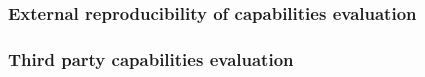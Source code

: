 \documentclass{article}
\begin{document}

\subsubsection{External reproducibility of capabilities evaluation}

\subsubsection{Third party capabilities evaluation}

\end{document}
